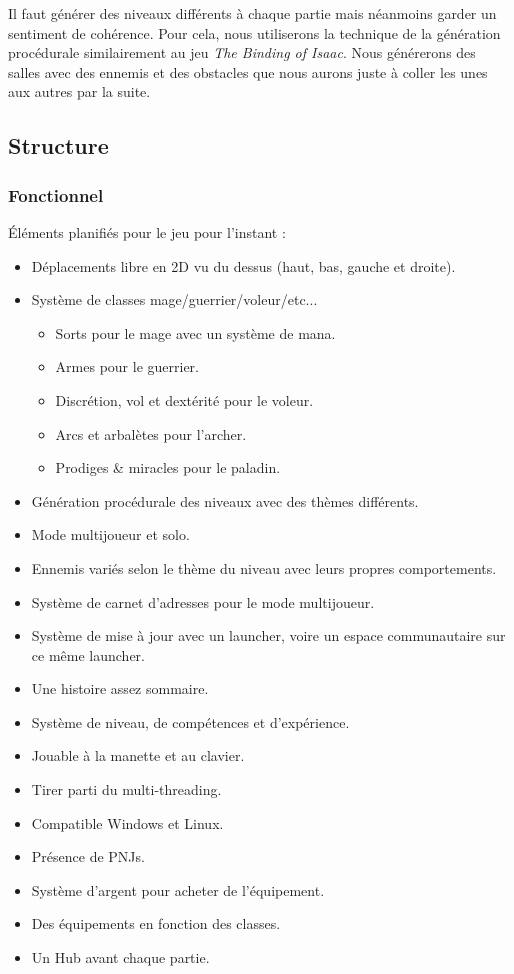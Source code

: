 \documentclass{article}
\begin{document}
Il faut générer des niveaux différents à chaque partie mais néanmoins garder un sentiment de cohérence. Pour cela, nous utiliserons la technique de la génération procédurale similairement au jeu \textit{The Binding of Isaac}. Nous générerons des salles avec des ennemis et des obstacles que nous aurons juste à coller les unes aux autres par la suite.

\subsection{Structure}

\subsubsection{Fonctionnel}

Éléments planifiés pour le jeu pour l'instant :
\begin{itemize}
    \item Déplacements libre en 2D vu du dessus (haut, bas, gauche et droite).
    \item Système de classes mage/guerrier/voleur/etc...
    \begin{itemize}
        \item Sorts pour le mage avec un système de mana.
        \item Armes pour le guerrier.
        \item Discrétion, vol et dextérité pour le voleur.
        \item Arcs et arbalètes pour l'archer.
        \item Prodiges \& miracles pour le paladin.
    \end{itemize}
    \item Génération procédurale des niveaux avec des thèmes différents.
    \item Mode multijoueur et solo.
    \item Ennemis variés selon le thème du niveau avec leurs propres comportements.
    \item Système de carnet d'adresses pour le mode multijoueur.
    \item Système de mise à jour avec un launcher, voire un espace communautaire sur ce même launcher.
    \item Une histoire assez sommaire.
    \item Système de niveau, de compétences et d'expérience.
    \item Jouable à la manette et au clavier.
    \item Tirer parti du multi-threading.
    \item Compatible Windows et Linux.
    \item Présence de PNJs.
    \item Système d'argent pour acheter de l'équipement.
    \item Des équipements en fonction des classes.
    \item Un Hub avant chaque partie.
\end{itemize}
\end{document}
